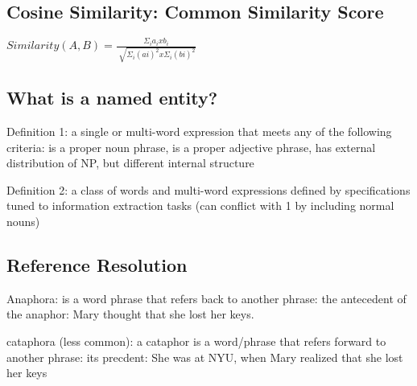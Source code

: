 \documentclass[a4paper]{article}
\begin{document}
\subsection{Cosine Similarity: Common Similarity Score}
\par{$Similarity(A,B) = \frac{\Sigma_i a_i x b_i}{\sqrt[]{\Sigma_i (ai)^2 x \Sigma_i (bi)^2} }$}

\subsection{What is a named entity?}
\par{Definition 1: a single or multi-word expression that meets any of the following criteria: is a proper noun phrase, is a proper adjective phrase, has external distribution of NP, but different internal structure}
\par{Definition 2: a class of words and multi-word expressions defined by specifications tuned to information extraction tasks (can conflict with 1 by including normal nouns) }

\subsection{Reference Resolution}
\par{Anaphora: is a word phrase that refers back to another phrase: the antecedent of the anaphor: Mary thought that she lost her keys.}
\par{cataphora (less common): a cataphor is a word/phrase that refers forward to another phrase: its precdent: She was at NYU, when Mary realized that she lost her keys}
\end{document}
